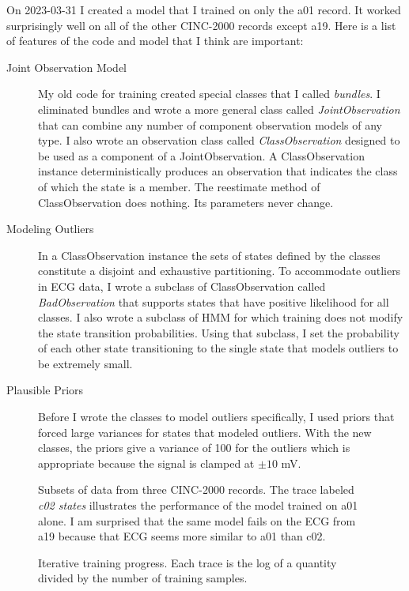 \documentclass[12pt]{article}
\begin{document}
On 2023-03-31 I created a model that I trained on only the a01 record.
It worked surprisingly well on all of the other CINC-2000 records
except a19.  Here is a list of features of the code and model that I
think are important:
\begin{description}
\item[Joint Observation Model] My old code for training created
  special classes that I called \emph{bundles}.  I eliminated bundles
  and wrote a more general class called \emph{JointObservation} that
  can combine any number of component observation models of any type.
  I also wrote an observation class called \emph{ClassObservation}
  designed to be used as a component of a JointObservation.  A
  ClassObservation instance deterministically produces an observation
  that indicates the class of which the state is a member.  The
  reestimate method of ClassObservation does nothing.  Its parameters
  never change.
\item[Modeling Outliers] In a ClassObservation instance the sets of
  states defined by the classes constitute a disjoint and exhaustive
  partitioning.  To accommodate outliers in ECG data, I wrote a
  subclass of ClassObservation called \emph{BadObservation} that
  supports states that have positive likelihood for all classes.  I
  also wrote a subclass of HMM for which training does not modify the
  state transition probabilities.  Using that subclass, I set the
  probability of each other state transitioning to the single state
  that models outliers to be extremely small.
\item[Plausible Priors] Before I wrote the classes to model outliers
  specifically, I used priors that forced large variances for states
  that modeled outliers.  With the new classes, the priors give a
  variance of 100 for the outliers which is appropriate because the
  signal is clamped at $\pm 10$ mV.
\end{description}

\begin{figure}
  \centering
  \caption{Subsets of data from three CINC-2000 records.  The trace
    labeled \emph{c02 states} illustrates the performance of the model
    trained on a01 alone.  I am surprised that the same model fails on
    the ECG from a19 because that ECG seems more similar to a01 than
    c02.}
  \label{fig:a01a19c02}
\end{figure}

\begin{figure}
  \centering
  \caption{Iterative training progress.  Each trace is the log of a
    quantity divided by the number of training samples.}
  \label{fig:train_log}
\end{figure}
\end{document}
